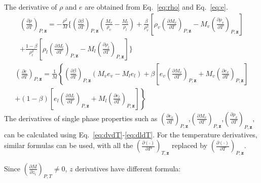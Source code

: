 The derivative of $\rho$ and $e$ are obtained from Eq.~\ref{eq:rho} and Eq.~\ref{eq:e}.
\begin{align}
	\left(\frac{\partial \rho}{\partial T} \right)_{P,\mathbf{z}}=
	- \frac{\rho^2}{M}\Bigg\{\left(\frac{\partial \beta}{\partial T}\right)_{P,\mathbf{z}}\left(\frac{M_v}{\rho_v}-\frac{M_l}{\rho_l}\right) +
	\frac{\beta}{\rho_v^2}\left[\rho_v\left(\frac{\partial M_v}{\partial T} \right)_{P,\mathbf{z}}-M_v \left(\frac{\partial \rho_v}{\partial T} \right)_{P,\mathbf{z}}\right]\nonumber \\+
	\frac{1-\beta}{\rho_l^2}\left[\rho_l\left(\frac{\partial M_l}{\partial T} \right)_{P,\mathbf{z}}-M_l \left(\frac{\partial \rho_l}{\partial T} \right)_{P,\mathbf{z}}\right]\Bigg\}
\end{align}
\begin{align}
	\left(\frac{\partial e}{\partial T}\right)_{P,\mathbf{z}}= \frac{1}{M}\left\{ \left(\frac{\partial \beta}{\partial T}\right)_{P,\mathbf{z}} \left(M_v e_v-M_l e_l\right)+\beta \left[e_v\left(\frac{\partial M_v}{\partial T}\right)_{P,\mathbf{z}}+M_v\left(\frac{\partial e_v}{\partial T}\right)_{P,\mathbf{z}}\right]\right.\nonumber \\ \left.+\left(1-\beta\right)\left[e_l\left(\frac{\partial M_l}{\partial T}\right)_{P,\mathbf{z}}+M_l\left(\frac{\partial e_l}{\partial T}\right)_{P,\mathbf{z}}\right]\right\}
\end{align}
The derivatives of single phase properties such as $\left(\frac{\partial e_v}{\partial T}\right)_{P,\mathbf{z}}$,$\left(\frac{\partial M_v}{\partial T}\right)_{P,\mathbf{z}}$,$\left(\frac{\partial \rho_v}{\partial T} \right)_{P,\mathbf{z}}$, can be calculated using Eq.~\ref{eq:dvdT}-\ref{eq:dldT}. For the temperature derivatives, similar formulas can be used, with all the $\left(\frac{\partial (\cdot)}{\partial P}\right)_{T,\mathbf{z}}$ replaced by $\left(\frac{\partial (\cdot)}{\partial T}\right)_{P,\mathbf{z}}$.

Since  $\left(\frac{\partial M}{\partial z_i}\right)_{P,T} \neq 0 $, $z$ derivatives have different formula:

